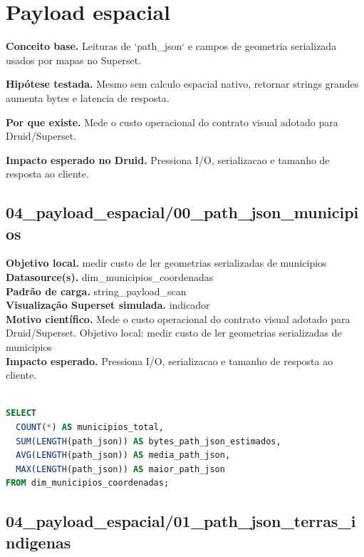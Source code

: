 \documentclass[11pt,a4paper]{article}
\begin{document}
\section{Payload espacial}

\textbf{Conceito base.} Leituras de `path\_json` e campos de geometria serializada usados por mapas no Superset.

\textbf{Hipótese testada.} Mesmo sem calculo espacial nativo, retornar strings grandes aumenta bytes e latencia de resposta.

\textbf{Por que existe.} Mede o custo operacional do contrato visual adotado para Druid/Superset.

\textbf{Impacto esperado no Druid.} Pressiona I/O, serializacao e tamanho de resposta ao cliente.

\subsection{04\_payload\_espacial/00\_path\_json\_municipios}

\textbf{Objetivo local.} medir custo de ler geometrias serializadas de municipios\\

\textbf{Datasource(s).} dim\_municipios\_coordenadas\\

\textbf{Padrão de carga.} string\_payload\_scan\\

\textbf{Visualização Superset simulada.} indicador\\

\textbf{Motivo científico.} Mede o custo operacional do contrato visual adotado para Druid/Superset. Objetivo local: medir custo de ler geometrias serializadas de municipios\\

\textbf{Impacto esperado.} Pressiona I/O, serializacao e tamanho de resposta ao cliente.

\begin{lstlisting}[language=SQL]

SELECT
  COUNT(*) AS municipios_total,
  SUM(LENGTH(path_json)) AS bytes_path_json_estimados,
  AVG(LENGTH(path_json)) AS media_path_json,
  MAX(LENGTH(path_json)) AS maior_path_json
FROM dim_municipios_coordenadas;

\end{lstlisting}

\subsection{04\_payload\_espacial/01\_path\_json\_terras\_indigenas}
\end{document}
